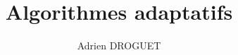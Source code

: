 \documentclass[a4paper,10pt]{report}
\title{Algorithmes adaptatifs}
\author{Adrien DROGUET}
\begin{document}
\maketitle

\begin{abstract}
\end{abstract}
\end{document}
